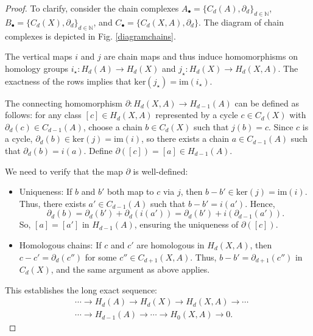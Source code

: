 \begin{proof}
	To clarify, consider the chain complexes
	$A_{\bullet} = \{C_{d}(A), \partial_{d}\}_{d\in\mathbb{N}}$, $B_{\bullet} = \{C
	_{d}(X), \partial_{d}\}_{d\in\mathbb{N}}$, and
	$C_{\bullet} = \{C_{d}(X,A), \partial_{d}\}$. The diagram of chain complexes is
	depicted in Fig. \ref{diagramchains}.

	The vertical maps $i$ and $j$ are chain maps and thus induce homomorphisms on
	homology groups $i_{\star}: H_{d}(A) \rightarrow H_{d}(X)$ and
	$j_{\star}: H_{d}(X) \rightarrow H_{d}(X,A)$. The exactness of the rows implies
	that $\mathrm{ker}(j_{\star}) = \mathrm{im}(i_{\star})$.

	The connecting homomorphism $\partial: H_{d}(X,A) \rightarrow H_{d-1}(A)$ can be
	defined as follows: for any class $[c] \in H_{d}(X,A)$ represented by a cycle
	$c \in C_{d}(X)$ with $\partial_{d}(c) \in C_{d-1}(A)$, choose a chain $b \in C
	_{d}(X)$ such that $j(b) = c$. Since $c$ is a cycle, $\partial_{d}(b) \in \mathrm{ker}
	(j) = \mathrm{im}(i)$, so there exists a chain $a \in C_{d-1}(A)$ such that
	$\partial_{d}(b) = i(a)$. Define $\partial([c]) = [a] \in H_{d-1}(A)$.

	We need to verify that the map $\partial$ is well-defined:
	\begin{itemize}
		\item Uniqueness: If $b$ and $b'$ both map to $c$ via $j$, then $b - b' \in \mathrm{ker}
			(j) = \mathrm{im}(i)$. Thus, there exists $a' \in C_{d-1}(A)$ such that $b
			- b' = i(a')$. Hence,
			\[
				\partial_{d}(b) = \partial_{d}(b') + \partial_{d}(i(a')) = \partial_{d}(b
				') + i(\partial_{d-1}(a')).
			\]
			So, $[a] = [a']$ in $H_{d-1}(A)$, ensuring the uniqueness of $\partial([c])$.

		\item Homologous chains: If $c$ and $c'$ are homologous in $H_{d}(X,A)$, then
			$c - c' = \partial_{d}(c'')$ for some $c'' \in C_{d+1}(X,A)$. Thus, $b - b'
			= \partial_{d+1}(c'')$ in $C_{d}(X)$, and the same argument as above
			applies.
	\end{itemize}

	This establishes the long exact sequence:
	\begin{align}
		&\cdots \rightarrow H_{d}(A) \rightarrow H_{d}(X) \rightarrow H_{d}(X,A) \rightarrow \cdots \\
		&\cdots \rightarrow H_{d-1}(A) \rightarrow \cdots \rightarrow H_{0}(X,A) \rightarrow 0.
	\end{align}
\end{proof}

